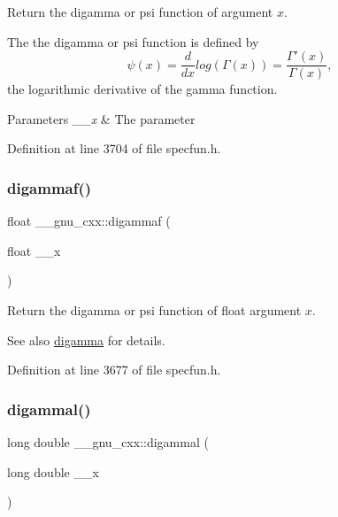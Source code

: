 Return the digamma or psi function of argument $ x $.

The the digamma or psi function is defined by \[ \psi(x) = \frac{d}{dx}log\left(\Gamma(x)\right) = \frac{\Gamma'(x)}{\Gamma(x)}, \] the logarithmic derivative of the gamma function.


\begin{DoxyParams}{Parameters}
{\em \+\_\+\+\_\+x} & The parameter \\
\hline
\end{DoxyParams}


Definition at line 3704 of file specfun.\+h.

\mbox{\label{group__gnu__math__spec__func_ga65b58ffe1d02ccda1113539b62d87b94}} 
\subsubsection{\texorpdfstring{digammaf()}{digammaf()}}
{\footnotesize\ttfamily float \+\_\+\+\_\+gnu\+\_\+cxx\+::digammaf (\begin{DoxyParamCaption}\item[{float}]{\+\_\+\+\_\+x }\end{DoxyParamCaption})\hspace{0.3cm}{\ttfamily [inline]}}

Return the digamma or psi function of {\ttfamily float} argument $ x $.

\begin{DoxySeeAlso}{See also}
\hyperlink{group__gnu__math__spec__func_ga7b87300edf8754d959e1d94fe0c9246e}{digamma} for details. 
\end{DoxySeeAlso}


Definition at line 3677 of file specfun.\+h.

\mbox{\label{group__gnu__math__spec__func_gaaa1bf1503709175915cb81bcd4355ccf}} 
\subsubsection{\texorpdfstring{digammal()}{digammal()}}
{\footnotesize\ttfamily long double \+\_\+\+\_\+gnu\+\_\+cxx\+::digammal (\begin{DoxyParamCaption}\item[{long double}]{\+\_\+\+\_\+x }\end{DoxyParamCaption})\hspace{0.3cm}{\ttfamily [inline]}}

